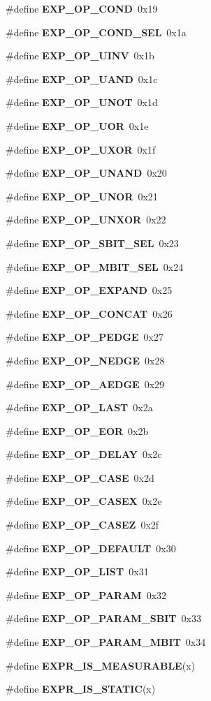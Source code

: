 \begin{CompactItemize}
\item 
\#define {\bf EXP\_\-OP\_\-COND}\ 0x19
\item 
\#define {\bf EXP\_\-OP\_\-COND\_\-SEL}\ 0x1a
\item 
\#define {\bf EXP\_\-OP\_\-UINV}\ 0x1b
\item 
\#define {\bf EXP\_\-OP\_\-UAND}\ 0x1c
\item 
\#define {\bf EXP\_\-OP\_\-UNOT}\ 0x1d
\item 
\#define {\bf EXP\_\-OP\_\-UOR}\ 0x1e
\item 
\#define {\bf EXP\_\-OP\_\-UXOR}\ 0x1f
\item 
\#define {\bf EXP\_\-OP\_\-UNAND}\ 0x20
\item 
\#define {\bf EXP\_\-OP\_\-UNOR}\ 0x21
\item 
\#define {\bf EXP\_\-OP\_\-UNXOR}\ 0x22
\item 
\#define {\bf EXP\_\-OP\_\-SBIT\_\-SEL}\ 0x23
\item 
\#define {\bf EXP\_\-OP\_\-MBIT\_\-SEL}\ 0x24
\item 
\#define {\bf EXP\_\-OP\_\-EXPAND}\ 0x25
\item 
\#define {\bf EXP\_\-OP\_\-CONCAT}\ 0x26
\item 
\#define {\bf EXP\_\-OP\_\-PEDGE}\ 0x27
\item 
\#define {\bf EXP\_\-OP\_\-NEDGE}\ 0x28
\item 
\#define {\bf EXP\_\-OP\_\-AEDGE}\ 0x29
\item 
\#define {\bf EXP\_\-OP\_\-LAST}\ 0x2a
\item 
\#define {\bf EXP\_\-OP\_\-EOR}\ 0x2b
\item 
\#define {\bf EXP\_\-OP\_\-DELAY}\ 0x2c
\item 
\#define {\bf EXP\_\-OP\_\-CASE}\ 0x2d
\item 
\#define {\bf EXP\_\-OP\_\-CASEX}\ 0x2e
\item 
\#define {\bf EXP\_\-OP\_\-CASEZ}\ 0x2f
\item 
\#define {\bf EXP\_\-OP\_\-DEFAULT}\ 0x30
\item 
\#define {\bf EXP\_\-OP\_\-LIST}\ 0x31
\item 
\#define {\bf EXP\_\-OP\_\-PARAM}\ 0x32
\item 
\#define {\bf EXP\_\-OP\_\-PARAM\_\-SBIT}\ 0x33
\item 
\#define {\bf EXP\_\-OP\_\-PARAM\_\-MBIT}\ 0x34
\item 
\#define {\bf EXPR\_\-IS\_\-MEASURABLE}(x)
\item 
\#define {\bf EXPR\_\-IS\_\-STATIC}(x)

\end{CompactItemize}
